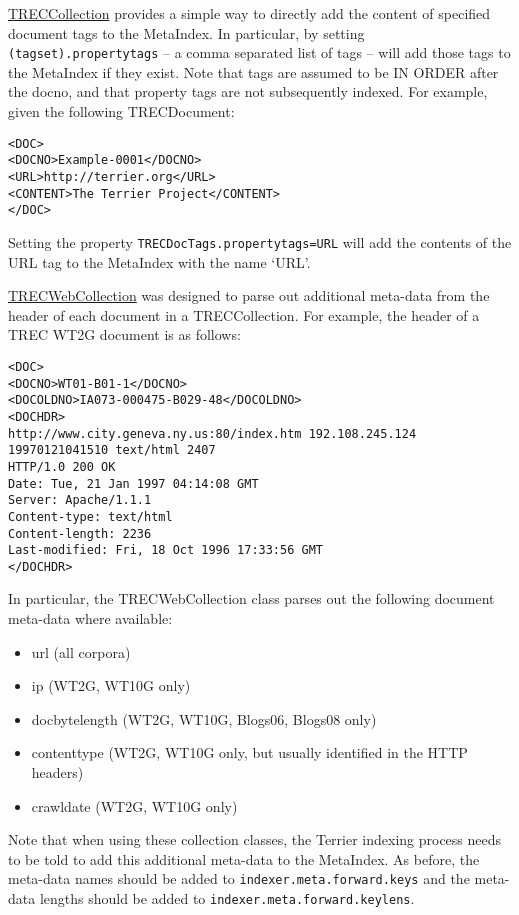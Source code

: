\href{javadoc/org/terrier/indexing/TRECCollection.html}{TRECCollection}
provides a simple way to directly add the content of specified document
tags to the MetaIndex. In particular, by setting
\texttt{(tagset).propertytags} -- a comma separated list of tags -- will
add those tags to the MetaIndex if they exist. Note that tags are
assumed to be IN ORDER after the docno, and that property tags are not
subsequently indexed. For example, given the following TRECDocument:

\begin{verbatim}
<DOC>
<DOCNO>Example-0001</DOCNO>
<URL>http://terrier.org</URL>
<CONTENT>The Terrier Project</CONTENT>
</DOC>
\end{verbatim}

Setting the property \texttt{TRECDocTags.propertytags=URL} will add the
contents of the URL tag to the MetaIndex with the name `URL'.

\href{javadoc/org/terrier/indexing/TRECWebCollection.html}{TRECWebCollection}
was designed to parse out additional meta-data from the header of each
document in a TRECCollection. For example, the header of a TREC WT2G
document is as follows:

\begin{verbatim}
<DOC>
<DOCNO>WT01-B01-1</DOCNO>
<DOCOLDNO>IA073-000475-B029-48</DOCOLDNO>
<DOCHDR>
http://www.city.geneva.ny.us:80/index.htm 192.108.245.124 19970121041510 text/html 2407
HTTP/1.0 200 OK
Date: Tue, 21 Jan 1997 04:14:08 GMT
Server: Apache/1.1.1
Content-type: text/html
Content-length: 2236
Last-modified: Fri, 18 Oct 1996 17:33:56 GMT
</DOCHDR>
\end{verbatim}

In particular, the TRECWebCollection class parses out the following
document meta-data where available:

\begin{itemize}
\tightlist
\item
  url (all corpora)
\item
  ip (WT2G, WT10G only)
\item
  docbytelength (WT2G, WT10G, Blogs06, Blogs08 only)
\item
  contenttype (WT2G, WT10G only, but usually identified in the HTTP
  headers)
\item
  crawldate (WT2G, WT10G only)
\end{itemize}

Note that when using these collection classes, the Terrier indexing
process needs to be told to add this additional meta-data to the
MetaIndex. As before, the meta-data names should be added to
\texttt{indexer.meta.forward.keys} and the meta-data lengths should be
added to \texttt{indexer.meta.forward.keylens}.

